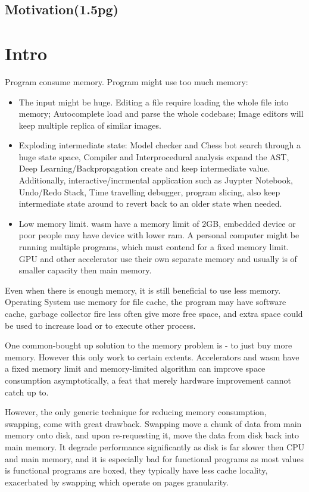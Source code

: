 \subsection{Motivation(1.5pg)}
\section{Intro}
Program consume memory. Program might use too much memory:
\begin{itemize}
	\item The input might be huge. Editing a file require loading the whole file into memory; Autocomplete load and parse the whole codebase; Image editors will keep multiple replica of similar images.
	\item Exploding intermediate state: Model checker and Chess bot search through a huge state space, Compiler and Interprocedural analysis expand the AST, Deep Learning/Backpropagation create and keep intermediate value. Additionally, interactive/incrmental application such as Juypter Notebook, Undo/Redo Stack, Time travelling debugger, program slicing, also keep intermediate state around to revert back to an older state when needed.
	\item Low memory limit. wasm have a memory limit of 2GB, embedded device or poor people may have device with lower ram. A personal computer might be running multiple programs, which must contend for a fixed memory limit. GPU and other accelerator use their own separate memory and usually is of smaller capacity then main memory.
\end{itemize}

Even when there is enough memory, it is still beneficial to use less memory. Operating System use memory for file cache, the program may have software cache, garbage collector fire less often give more free space, and extra space could be used to increase load or to execute other process.

One common-bought up solution to the memory problem is - to just buy more memory. However this only work to certain extents. Accelerators and wasm have a fixed memory limit and memory-limited algorithm can improve space consumption asymptotically, a feat that merely hardware improvement cannot catch up to. 

However, the only generic technique for reducing memory consumption, swapping, come with great drawback. Swapping move a chunk of data from main memory onto disk, and upon re-requesting it, move the data from disk back into main memory. It degrade performance significantly as disk is far slower then CPU and main memory, and it is especially bad for functional programs as most values is functional programs are boxed, they typically have less cache locality, exacerbated by swapping which operate on pages granularity.


